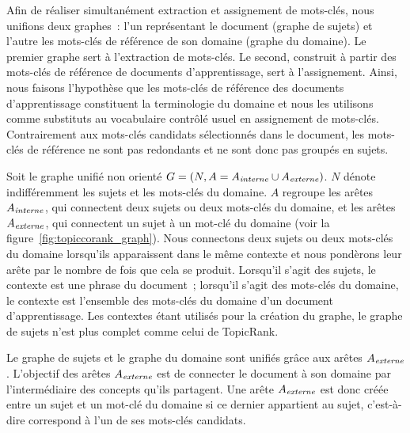\documentclass[10pt,twoside]{article}
\begin{document}
            Afin de réaliser simultanément extraction et assignement de mots-clés, nous unifions deux graphes~: l'un représentant le document (graphe de sujets) et l'autre les mots-clés de référence de son domaine (graphe du domaine).
            Le premier graphe sert à l'extraction de mots-clés.
            Le second, construit à partir des mots-clés de référence de documents d'apprentissage, sert à l'assignement.
            Ainsi, nous faisons l'hypothèse que les mots-clés de référence des documents d'apprentissage constituent la terminologie du domaine et nous les utilisons comme substituts au vocabulaire contrôlé usuel en assignement de mots-clés.
            Contrairement aux mots-clés candidats sélectionnés dans le document, les mots-clés de référence ne sont pas redondants et ne sont donc pas groupés en sujets.

        Soit le graphe unifié non orienté \mbox{$G = (N, A = A_{\textnormal{\textit{interne}}} \cup A_{\textnormal{\textit{externe}}})$}.
        $N$ dénote indifféremment les sujets et les mots-clés du domaine.
        $A$ regroupe les arêtes $A_{\textnormal{\textit{interne}}}$, qui connectent deux sujets ou deux mots-clés du domaine, et les arêtes $A_{\textnormal{\textit{externe}}}$, qui connectent un sujet à un mot-clé du domaine (voir la figure~\ref{fig:topiccorank_graph}).
        Nous connectons deux sujets ou deux mots-clés du domaine lorsqu'ils apparaissent dans le même contexte et nous pondèrons leur arête par le nombre de fois que cela se produit.
        Lorsqu'il s'agit des sujets, le contexte est une phrase du document~; lorsqu'il s'agit des mots-clés du domaine, le contexte est l'ensemble des mots-clés du domaine d'un document d'apprentissage.
        Les contextes étant utilisés pour la création du graphe, le graphe de sujets n'est plus complet comme celui de TopicRank.

        Le graphe de sujets et le graphe du domaine sont unifiés grâce aux arêtes $A_{\textnormal{\textit{externe}}}$.
        L'objectif des arêtes $A_{\textnormal{\textit{externe}}}$ est de connecter le document  à son domaine par l'intermédiaire des concepts qu'ils partagent.
        Une arête $A_{\textnormal{\textit{externe}}}$ est donc créée entre un sujet et un mot-clé du domaine si ce dernier appartient au sujet, c'est-à-dire correspond à l'un de ses mots-clés candidats.
        
\end{document}
